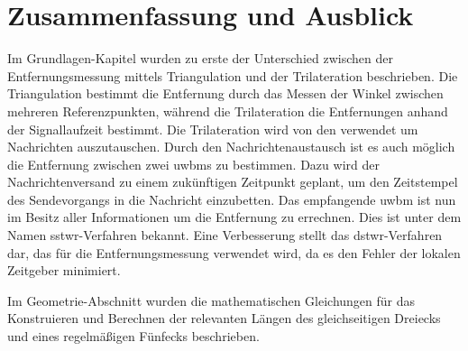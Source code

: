 %
%	
%	
%
\chapter{Zusammenfassung und Ausblick}

Im Grundlagen-Kapitel wurden zu erste der Unterschied zwischen der Entfernungsmessung mittels Triangulation und der Trilateration beschrieben. Die Triangulation bestimmt die Entfernung durch das Messen der Winkel zwischen mehreren Referenzpunkten, während die Trilateration die Entfernungen anhand der Signallaufzeit bestimmt. Die Trilateration wird von den  verwendet um Nachrichten auszutauschen. Durch den Nachrichtenaustausch ist es auch möglich die Entfernung zwischen zwei \glspl{uwbm} zu bestimmen. Dazu wird der Nachrichtenversand zu einem zukünftigen Zeitpunkt geplant, um den Zeitstempel des Sendevorgangs in die Nachricht einzubetten. Das empfangende \gls{uwbm} ist nun im Besitz aller Informationen um die Entfernung zu errechnen. Dies ist unter dem Namen \gls{sstwr}-Verfahren bekannt. Eine Verbesserung stellt das \gls{dstwr}-Verfahren dar, das für die Entfernungsmessung verwendet wird, da es den Fehler der lokalen Zeitgeber minimiert.

Im Geometrie-Abschnitt wurden die mathematischen Gleichungen für das Konstruieren und Berechnen der relevanten Längen des gleichseitigen Dreiecks und eines regelmäßigen Fünfecks beschrieben.


